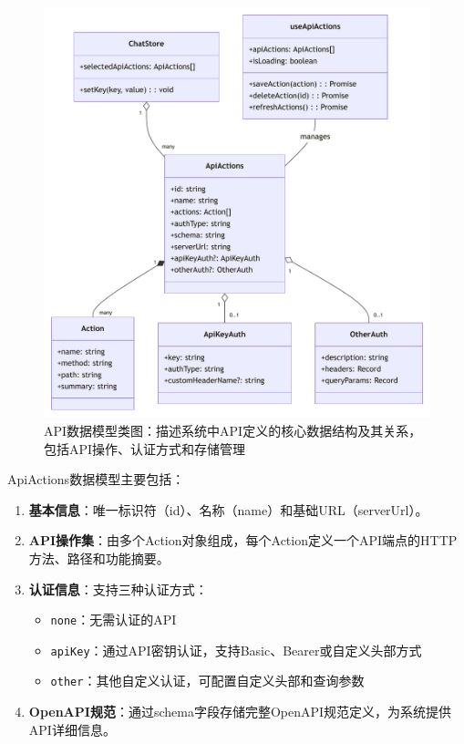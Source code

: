 \begin{figure}[htbp]
  \centering
  \includegraphics[width=\textwidth]{figures/api_actions_class.pdf}
  \caption{API数据模型类图：描述系统中API定义的核心数据结构及其关系，包括API操作、认证方式和存储管理}
  \label{fig:api_actions_class}
\end{figure}

ApiActions数据模型主要包括：

\begin{enumerate}
  \item \textbf{基本信息}：唯一标识符（id）、名称（name）和基础URL（serverUrl）。
  
  \item \textbf{API操作集}：由多个Action对象组成，每个Action定义一个API端点的HTTP方法、路径和功能摘要。
  
  \item \textbf{认证信息}：支持三种认证方式：
    \begin{itemize}
      \item \texttt{none}：无需认证的API
      \item \texttt{apiKey}：通过API密钥认证，支持Basic、Bearer或自定义头部方式
      \item \texttt{other}：其他自定义认证，可配置自定义头部和查询参数
    \end{itemize}
  
  \item \textbf{OpenAPI规范}：通过schema字段存储完整OpenAPI规范定义，为系统提供API详细信息。
\end{enumerate}

